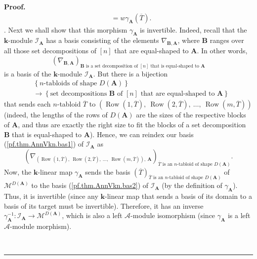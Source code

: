 \documentclass[numbers=enddot,12pt,final,onecolumn,notitlepage]{scrartcl}%
\numberwithin{exer}{subsection}
\theoremstyle{definition}
\newenvironment{proof}[1][Proof]{\noindent\textbf{#1.} }{\ \rule{0.5em}{0.5em}}
\begin{document}
\begin{proof}
{\begin{align*}
&  =w\gamma_{\mathbf{A}}\left(  \overline{T}\right)  .
\end{align*}
}. Next we shall show that this morphism $\gamma_{\mathbf{A}}$ is invertible.
Indeed, recall that the $\mathbf{k}$-module $\mathcal{I}_{\mathbf{A}}$ has a
basis consisting of the elements $\nabla_{\mathbf{B},\mathbf{A}}$, where
$\mathbf{B}$ ranges over all those set decompositions of $\left[  n\right]  $
that are equal-shaped to $\mathbf{A}$. In other words,%
\begin{equation}
\left(  \nabla_{\mathbf{B},\mathbf{A}}\right)  _{\mathbf{B}\text{ is a set
decomposition of }\left[  n\right]  \text{ that is equal-shaped to }%
\mathbf{A}} \label{pf.thm.AnnVkn.bas1}%
\end{equation}
is a basis of the $\mathbf{k}$-module $\mathcal{I}_{\mathbf{A}}$. But there is
a bijection%
\begin{align*}
&  \left\{  n\text{-tabloids of shape }D\left(  \mathbf{A}\right)  \right\} \\
&  \rightarrow\left\{  \text{set decompositions }\mathbf{B}\text{ of }\left[
n\right]  \text{ that are equal-shaped to }\mathbf{A}\right\}
\end{align*}
that sends each $n$-tabloid $\overline{T}$ to $\left(  \operatorname*{Row}%
\left(  1,\overline{T}\right)  ,\ \operatorname*{Row}\left(  2,\overline
{T}\right)  ,\ \ldots,\ \operatorname*{Row}\left(  m,\overline{T}\right)
\right)  $ (indeed, the lengths of the rows of $D\left(  \mathbf{A}\right)  $
are the sizes of the respective blocks of $\mathbf{A}$, and thus are exactly
the right size to fit the blocks of a set decomposition $\mathbf{B}$ that is
equal-shaped to $\mathbf{A}$). Hence, we can reindex our basis
(\ref{pf.thm.AnnVkn.bas1}) of $\mathcal{I}_{\mathbf{A}}$ as
\begin{equation}
\left(  \nabla_{\left(  \operatorname*{Row}\left(  1,\overline{T}\right)
,\ \operatorname*{Row}\left(  2,\overline{T}\right)  ,\ \ldots
,\ \operatorname*{Row}\left(  m,\overline{T}\right)  \right)  ,\ \mathbf{A}%
}\right)  _{\overline{T}\text{ is an }n\text{-tabloid of shape }D\left(
\mathbf{A}\right)  }. \label{pf.thm.AnnVkn.bas2}%
\end{equation}
Now, the $\mathbf{k}$-linear map $\gamma_{\mathbf{A}}$ sends the basis
$\left(  \overline{T}\right)  _{\overline{T}\text{ is an }n\text{-tabloid of
shape }D\left(  \mathbf{A}\right)  }$ of $\mathcal{M}^{D\left(  \mathbf{A}%
\right)  }$ to the basis (\ref{pf.thm.AnnVkn.bas2}) of $\mathcal{I}%
_{\mathbf{A}}$ (by the definition of $\gamma_{\mathbf{A}}$). Thus, it is
invertible (since any $\mathbf{k}$-linear map that sends a basis of its domain
to a basis of its target must be invertible). Therefore, it has an inverse
$\gamma_{\mathbf{A}}^{-1}:\mathcal{I}_{\mathbf{A}}\rightarrow\mathcal{M}%
^{D\left(  \mathbf{A}\right)  }$, which is also a left $\mathcal{A}$-module
isomorphism (since $\gamma_{\mathbf{A}}$ is a left $\mathcal{A}$-module morphism).


\end{proof}
\end{document}
